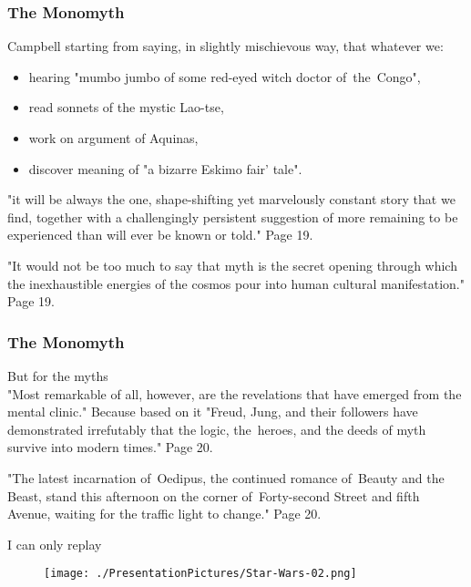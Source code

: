 \documentclass[10pt,t]{beamer}
\begin{document}
\begin{frame}
  \frametitle{The Monomyth}


  Campbell starting from saying, in slightly mischievous way, that
  whatever we:
  \begin{itemize}
    \RaggedRight

  \item hearing "mumbo jumbo of some red-eyed witch doctor
    of~the~Congo",

  \item read sonnets of the mystic Lao-tse,

  \item work on argument of Aquinas,

  \item discover meaning of "a bizarre Eskimo fair' tale".

  \end{itemize}
  "it will be always the one, shape-shifting yet marvelously
  constant story that we find, together with a challengingly
  persistent suggestion of more remaining to be experienced than
  will ever be known or told." Page 19.

  "It would not be too much to say that myth is the secret opening
  through which the inexhaustible energies of the cosmos pour into
  human cultural manifestation." Page 19.

\end{frame}





\begin{frame}
  \frametitle{The Monomyth}


  But for the myths \\
  "Most remarkable of all, however, are the revelations that have
  emerged from the mental clinic." Because based on it "Freud, Jung,
  and their followers have demonstrated irrefutably that the logic,
  the~heroes, and the deeds of myth survive into modern times." Page 20.

  "The latest incarnation of~Oedipus, the continued romance
  of~Beauty and the Beast, stand this afternoon on the corner
  of~Forty-second Street and fifth Avenue, waiting for the traffic
  light to change." Page 20.

  I can only replay


  \begin{figure}

    \centering

    \texttt{[image: ./PresentationPictures/Star-Wars-02.png]}

  \end{figure}

\end{frame}
\end{document}
